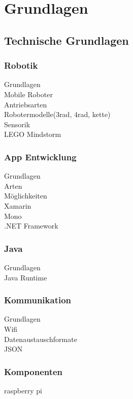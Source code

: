 \section{Grundlagen}
\subsection{Technische Grundlagen}
\subsubsection{Robotik}
Grundlagen\\
Mobile Roboter\\
Antriebsarten\\
Robotermodelle(3rad, 4rad, kette)\\
Sensorik\\
LEGO Mindstorm\\
\subsubsection{App Entwicklung}
Grundlagen\\
Arten\\
Möglichkeiten\\
Xamarin\\
Mono\\
.NET Framework\\
\subsubsection{Java}
Grundlagen\\
Java Runtime\\
\subsubsection{Kommunikation}
Grundlagen\\
Wifi\\
Datenaustauschformate\\
JSON\\
\subsubsection{Komponenten}
raspberry pi\\